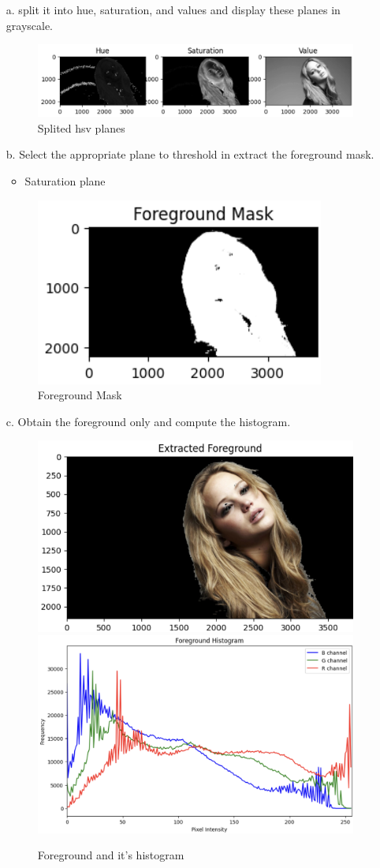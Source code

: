 \documentclass[12pt,a4paper]{article}
\begin{document}
    \begin{enumerate}
        \item[a.] split it into hue, saturation, and values and display these planes in grayscale.
    

    \begin{figure}[H]
        \centering
        \includegraphics[width=0.8\linewidth]{images/Screenshots/6a.png}
        \caption{Splited hsv planes}
        \label{fig:enter-label}
    \end{figure}

    \item[b.] Select the appropriate plane to threshold in extract the foreground mask.

    \begin{itemize}
        \item Saturation plane
    \end{itemize}
    
    \begin{figure}[H]
        \centering
        \includegraphics[width=0.3\linewidth]{images/Screenshots/6b.png}
        \caption{Foreground Mask}
        \label{fig:enter-label}
    \end{figure}

    \item[c.] Obtain the foreground only and compute the histogram.

    \begin{figure}[H]
        \centering
        \includegraphics[width=0.3\linewidth]{images/Screenshots/6c1.png}
        \includegraphics[width=0.3\linewidth]{images/Screenshots/6c2.png}
        \caption{Foreground and it's histogram}
        \label{fig:enter-label}
    \end{figure}


\end{enumerate}
\end{document}
